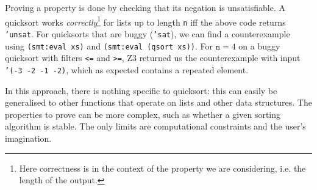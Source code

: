 Proving a property is done by checking that its negation is unsatisfiable. A
quicksort works \textit{correctly}\footnote{Here correctness is in the context
of the property we are considering, i.e. the length of the output.} for lists
up to length \texttt{n} iff the above code returns \texttt{'unsat}. For
quicksorts that are buggy (\texttt{'sat}), we can find a counterexample using
\texttt{(smt:eval xs)} and \texttt{(smt:eval (qsort xs))}. For $\mathtt{n}=4$
on a buggy quicksort with filters \texttt{<=} and \texttt{>=}, Z3 returned us
the counterexample with input \texttt{'(-3 -2 -1 -2)}, which as expected
contains a repeated element.

In this approach, there is nothing specific to quicksort: this can easily be
generalised to other functions that operate on lists and other data
structures. The properties to prove can be more complex, such as whether a
given sorting algorithm is stable. The only limits are computational
constraints and the user's imagination.
